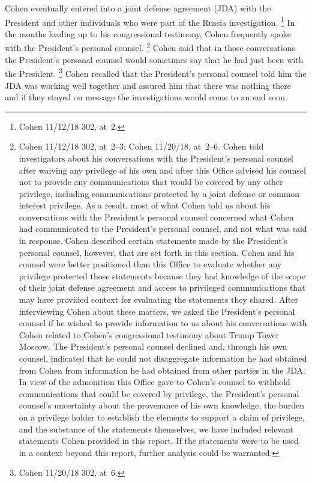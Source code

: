 Cohen eventually entered into a joint defense agreement (JDA) with the President and other individuals who were part of the Russia investigation.%
\footnote{Cohen 11/12/18 302, at~2.}
In the months leading up to his congressional testimony, Cohen frequently spoke with the President's personal counsel.%
\footnote{Cohen 11/12/18 302, at~2--3;
Cohen 11/20/18, at~2--6.
Cohen told investigators about his conversations with the President's personal counsel after waiving any privilege of his own and after this Office advised his counsel not to provide any communications that would be covered by any other privilege, including communications protected by a joint defense or common interest privilege.
As a result, most of what Cohen told us about his conversations with the President's personal counsel concerned what Cohen had communicated to the President's personal counsel, and not what was said in response.
Cohen described certain statements made by the President's personal counsel, however, that are set forth in this section.
Cohen and his counsel were better positioned than this Office to evaluate whether any privilege protected those statements because they had knowledge of the scope of their joint defense agreement and access to privileged communications that may have provided context for evaluating the statements they shared.
After interviewing Cohen about these matters, we asked the President's personal counsel if he wished to provide information to us about his conversations with Cohen related to Cohen's congressional testimony about Trump Tower Moscow.
The President's personal counsel declined and, through his own counsel, indicated that he could not disaggregate information he had obtained from Cohen from information he had obtained from other parties in the JDA\null.
In view of the admonition this Office gave to Cohen's counsel to withhold communications that could be covered by privilege, the President's personal counsel's uncertainty about the provenance of his own knowledge, the burden on a privilege holder to establish the elements to support a claim of privilege, and the substance of the statements themselves, we have included relevant statements Cohen provided in this report.
If the statements were to be used in a context beyond this report, further analysis could be warranted.}
Cohen said that in those conversations the President's personal counsel would sometimes say that he had just been with the President.%
\footnote{Cohen 11/20/18 302, at~6.}
Cohen recalled that the President's personal counsel told him the JDA was working well together and assured him that there was nothing there and if they stayed on message the investigations would come to an end soon.%

